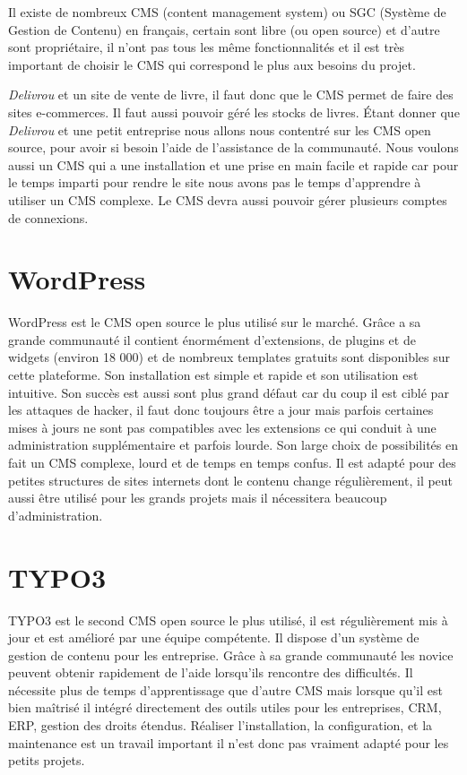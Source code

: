 \documentclass[a4paper,12pt]{report}
\begin{document}
Il existe de nombreux CMS (content management system) ou SGC (Système
de Gestion de Contenu) en français, certain sont libre (ou open source)
et d'autre sont propriétaire, il n'ont pas tous les même fonctionnalités
et il est très important de choisir le CMS qui correspond le plus aux
besoins du projet.

\textit{Delivrou} et un site de vente de livre, il faut donc que le CMS
permet de faire des sites e-commerces. Il faut aussi pouvoir géré les
stocks de livres. Étant donner que \textit{Delivrou} et une petit
entreprise nous allons nous contentré sur les CMS open source, pour
avoir si besoin l'aide de l'assistance de la communauté. Nous voulons
aussi un CMS qui a une installation et une prise en main facile et rapide
car pour le temps imparti pour rendre le site nous avons pas le temps
d'apprendre à utiliser un CMS complexe. Le CMS devra aussi pouvoir gérer
plusieurs comptes de connexions.

\section{WordPress}

WordPress est le CMS open source le plus utilisé sur le marché. Grâce
a sa grande communauté il contient énormément d’extensions, de plugins
et de widgets (environ 18 000) et de nombreux templates gratuits sont
disponibles sur cette plateforme. Son installation est simple et
rapide et son utilisation est intuitive.  Son succès est aussi sont
plus grand défaut car du coup il est ciblé par les attaques de hacker,
il faut donc toujours être a jour mais parfois certaines mises à jours
ne sont pas compatibles avec les extensions ce qui conduit à une
administration supplémentaire et parfois lourde. Son large choix de
possibilités en fait un CMS complexe, lourd et de temps en temps
confus.  Il est adapté pour des petites structures de sites internets
dont le contenu change régulièrement, il peut aussi être utilisé pour
les grands projets mais il nécessitera beaucoup d'administration.

\section{TYPO3}

TYPO3 est le second CMS open source le plus utilisé, il est
régulièrement mis à jour et est amélioré par une équipe compétente. Il
dispose d'un système de gestion de contenu pour les entreprise.  Grâce
à sa grande communauté les novice peuvent obtenir rapidement de l'aide
lorsqu'ils rencontre des difficultés.  Il nécessite plus de temps
d'apprentissage que d'autre CMS mais lorsque qu'il est bien maîtrisé
il intégré directement des outils utiles pour les entreprises, CRM,
ERP, gestion des droits étendus.  Réaliser l’installation, la
configuration, et la maintenance est un travail important il n'est
donc pas vraiment adapté pour les petits projets.
\end{document}
